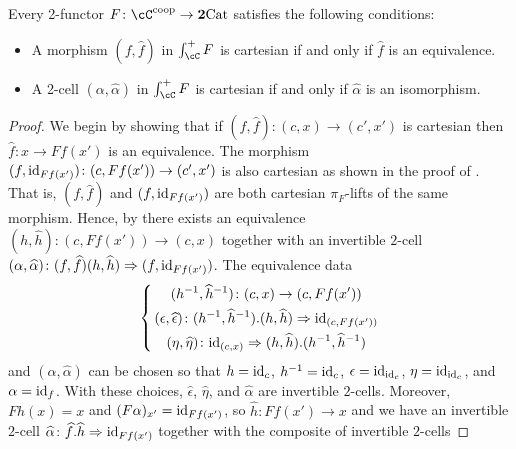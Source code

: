 \documentclass[11pt, dvipsnames]{amsart}
\begin{document}
        \begin{prop}\label{prop:markingsinGC}
        Every 2-functor $F\colon \cC^{\coop} \to \ttwocat$ satisfies the following conditions:
        \begin{itemize}
        \item A morphism $(f,\widehat{f})$ in $\int_{\cC}^{+} F$ is cartesian if and only if $\widehat{f}$ is an equivalence.
        \item A 2-cell $(\alpha,\widehat{\alpha})$ in $\int_{\cC}^{+} F$ is cartesian if and only if $\widehat{\alpha}$ is an isomorphism.
        \end{itemize}
        \end{prop}
        \begin{proof}
        We begin by showing that if $(f,\widehat{f})\colon (c,x)\to (c',x')$ is cartesian then $\widehat{f}\colon x \to Ff(x')$ is an equivalence. The morphism $(f,\mathrm{id}_{Ff(x')})\colon (c,Ff(x')) \to (c',x')$ is also cartesian as shown in the proof of \cite[Proposition 3.3.4]{Buckley2014}. That is, $(f,\widehat{f})$ and $(f,\mathrm{id}_{Ff(x')})$ are both cartesian $\pi_F$-lifts of the same morphism. Hence, by  there exists an equivalence $(h,\widehat{h})\colon (c,Ff(x')) \to (c,x)$ together with an invertible $2$-cell $(\alpha,\widehat{\alpha})\colon (f,\widehat{f})(h,\widehat{h}) \Rightarrow (f,\mathrm{id}_{Ff(x')})$. The equivalence data 
		\begin{equation*}
            \left\lbrace\,
            \begin{gathered}
            (h^{-1},\widehat{h}^{-1})\colon (c,x) \to (c,Ff(x')) \\ 
			(\epsilon,\widehat{\epsilon})\colon (h^{-1},\widehat{h}^{-1}).(h,\widehat{h}) \Rightarrow \mathrm{id}_{(c,Ff(x'))} \\
			(\eta,\widehat{\eta})\colon \mathrm{id}_{(c,x)} \Rightarrow (h,\widehat{h}).(h^{-1},\widehat{h}^{-1})
            \end{gathered}
            \right.
        \end{equation*}
		and $(\alpha,\widehat{\alpha})$ can be chosen so that $h=\mathrm{id}_c$, $h^{-1}=\mathrm{id}_c$, $\epsilon=\mathrm{id}_{\mathrm{id}_c}$, $\eta=\mathrm{id}_{\mathrm{id}_c}$, and $\alpha = \mathrm{id}_f$. With these choices, $\widehat{\epsilon}$, $\widehat{\eta}$, and $\widehat{\alpha}$ are invertible $2$-cells. Moreover, $Fh(x)= x$ and $(F\alpha)_{x'} = \mathrm{id}_{Ff(x')}$, so $\widehat{h}\colon Ff(x')\to x$ and we have an invertible $2$-cell $\widehat{\alpha}\colon \widehat{f}.\widehat{h}\Rightarrow \mathrm{id}_{Ff(x')}$ together with the composite of invertible $2$-cells
       

\end{proof}
\end{document}

